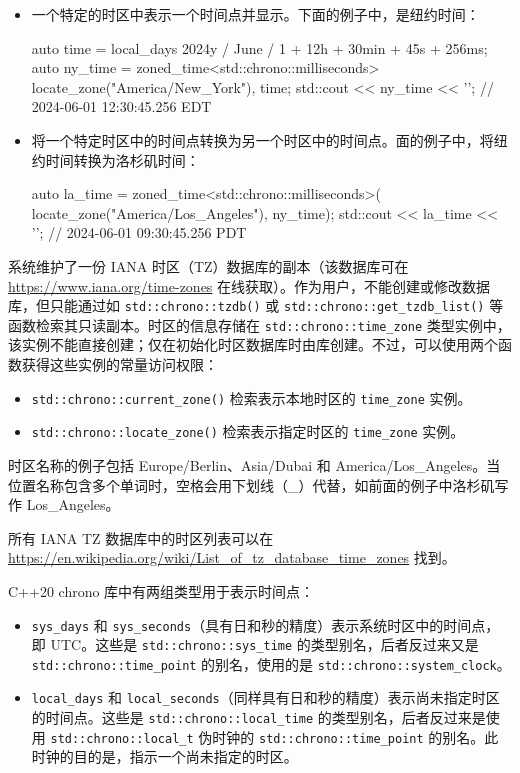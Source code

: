 \begin{itemize}
\item
一个特定的时区中表示一个时间点并显示。下面的例子中，是纽约时间：

\begin{cpp}
auto time = local_days{ 2024y / June / 1 } + 12h + 30min + 45s + 256ms;
auto ny_time = zoned_time<std::chrono::milliseconds>{
                    locate_zone("America/New_York"), time};
std::cout << ny_time << '\n';
// 2024-06-01 12:30:45.256 EDT
\end{cpp}

\item
将一个特定时区中的时间点转换为另一个时区中的时间点。面的例子中，将纽约时间转换为洛杉矶时间：

\begin{cpp}
auto la_time = zoned_time<std::chrono::milliseconds>(
                    locate_zone("America/Los_Angeles"),
                    ny_time);
std::cout << la_time << '\n'; // 2024-06-01 09:30:45.256 PDT
\end{cpp}
\end{itemize}


系统维护了一份 IANA 时区（TZ）数据库的副本（该数据库可在 \url{https://www.iana.org/time-zones} 在线获取）。作为用户，不能创建或修改数据库，但只能通过如 \verb|std::chrono::tzdb()| 或 \verb|std::chrono::get_tzdb_list()| 等函数检索其只读副本。时区的信息存储在 \verb|std::chrono::time_zone| 类型实例中，该实例不能直接创建；仅在初始化时区数据库时由库创建。不过，可以使用两个函数获得这些实例的常量访问权限：

\begin{itemize}
\item
\verb|std::chrono::current_zone()| 检索表示本地时区的 \verb|time_zone| 实例。

\item
\verb|std::chrono::locate_zone()| 检索表示指定时区的 \verb|time_zone| 实例。
\end{itemize}

时区名称的例子包括 Europe/Berlin、Asia/Dubai 和 America/Los\_Angeles。当位置名称包含多个单词时，空格会用下划线（\_）代替，如前面的例子中洛杉矶写作 Los\_Angeles。

所有 IANA TZ 数据库中的时区列表可以在 \url{https://en.wikipedia.org/wiki/List_of_tz_database_time_zones} 找到。

C++20 chrono 库中有两组类型用于表示时间点：

\begin{itemize}
\item
\verb|sys_days| 和 \verb|sys_seconds|（具有日和秒的精度）表示系统时区中的时间点，即 UTC。这些是 \verb|std::chrono::sys_time| 的类型别名，后者反过来又是 \verb|std::chrono::time_point| 的别名，使用的是 \verb|std::chrono::system_clock|。

\item
\verb|local_days| 和 \verb|local_seconds|（同样具有日和秒的精度）表示尚未指定时区的时间点。这些是 \verb|std::chrono::local_time| 的类型别名，后者反过来是使用 \verb|std::chrono::local_t| 伪时钟的 \verb|std::chrono::time_point| 的别名。此时钟的目的是，指示一个尚未指定的时区。
\end{itemize}

